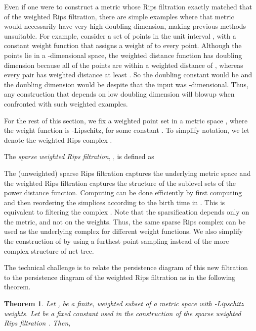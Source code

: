\documentclass[a4paper]{article}
\newtheorem{theorem}{Theorem}[section]
\begin{document}
Even if one were to construct a metric whose Rips filtration exactly matched that of the weighted Rips filtration, there are simple examples where that metric would necessarily have very high doubling dimension, making previous methods unsuitable.
For example, consider a set of points in the unit interval , with a constant weight function that assigns a weight of  to every point.
Although the points lie in a -dimensional space, the weighted distance function has doubling dimension  because all of the points are within a weighted distance of , whereas every pair has weighted distance at least .
So the doubling constant would be  and the doubling dimension would be  despite that the input was -dimensional.
Thus, any construction that depends on low doubling dimension will blowup when confronted with such weighted examples.





For the rest of this section, we fix a weighted point set  in a metric space , where the weight function  is -Lipschitz, for some constant .
To simplify notation, we let  denote the weighted Rips complex .


The \emph{sparse weighted Rips filtration}, , is defined as

The (unweighted) sparse Rips filtration  captures the underlying metric space and the weighted Rips filtration  captures the structure of the sublevel sets of the power distance function.
Computing  can be done efficiently by first computing  and then reordering the simplices according to the birth time in .
This is equivalent to filtering the complex .
Note that the sparsification depends only on the metric, and not on the weights.
Thus, the same sparse Rips complex can be used as the underlying complex for different weight functions.
We also simplify the construction of  by using a furthest point sampling instead of the more complex structure of net tree.





The technical challenge is to relate the persistence diagram of this new filtration to the persistence diagram of the weighted Rips filtration as in the following theorem.

\begin{theorem}\label{thm:sparse_weighted_rips}
  Let , be a finite, weighted subset of a metric space  with -Lipschitz weights.
  Let  be a fixed constant used in the construction of the sparse weighted Rips filtration .
  Then,
  
\end{theorem}
\end{document}
